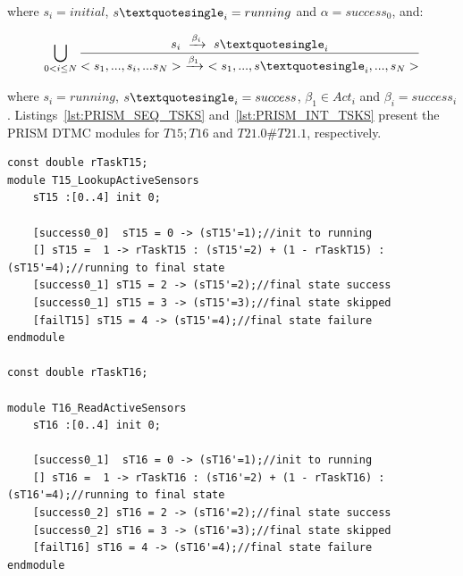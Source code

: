 \noindent
where $s_i = initial$, $s\textquotesingle_i = running$ and $\alpha = success_0$, and:

$$\bigcup_{0 < i \leq N} \frac{s_i\ \xrightarrow{\beta_i}\ s\textquotesingle_i}{<s_1,...,s_i,...s_N>\ \xrightarrow{\beta_1}\ <s_1, ..., s\textquotesingle_i, ..., s_N>}$$
\medskip

\noindent
where $s_i = running$, $ s\textquotesingle_i = success$, $\beta_1 \in Act_i$  and $\beta_i = success_i$. Listings~\ref{lst:PRISM_SEQ_TSKS} and~\ref{lst:PRISM_INT_TSKS} present the PRISM DTMC modules for $T15;T16$ and $T21.0\#T21.1$, respectively.
\medskip

\begin{lstlisting}[language=Prism, caption={Sequential tasks T15 and T16 as DTMC modules with final transitions of the first module synchronized to the initial transition of the second.},label={lst:PRISM_SEQ_TSKS}] 
const double rTaskT15;
module T15_LookupActiveSensors
	sT15 :[0..4] init 0;
	
	[success0_0]  sT15 = 0 -> (sT15'=1);//init to running	
	[] sT15 =  1 -> rTaskT15 : (sT15'=2) + (1 - rTaskT15) : (sT15'=4);//running to final state
	[success0_1] sT15 = 2 -> (sT15'=2);//final state success
	[success0_1] sT15 = 3 -> (sT15'=3);//final state skipped
	[failT15] sT15 = 4 -> (sT15'=4);//final state failure
endmodule

const double rTaskT16;

module T16_ReadActiveSensors
	sT16 :[0..4] init 0;
	
	[success0_1]  sT16 = 0 -> (sT16'=1);//init to running	
	[] sT16 =  1 -> rTaskT16 : (sT16'=2) + (1 - rTaskT16) : (sT16'=4);//running to final state
	[success0_2] sT16 = 2 -> (sT16'=2);//final state success
	[success0_2] sT16 = 3 -> (sT16'=3);//final state skipped
	[failT16] sT16 = 4 -> (sT16'=4);//final state failure
endmodule
\end{lstlisting}

